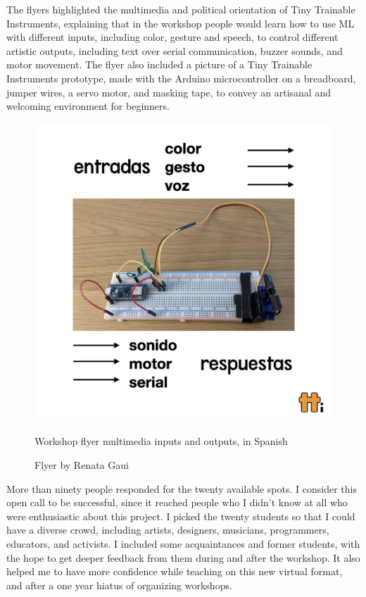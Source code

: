 The flyers highlighted the multimedia and political orientation of Tiny Trainable Instruments, explaining that in the workshop people would learn how to use \acrshort{ML} with different inputs, including color, gesture and speech, to control different artistic outputs, including text over serial communication, buzzer sounds, and motor movement. The flyer also included a picture of a Tiny Trainable Instruments prototype, made with the Arduino microcontroller on a breadboard, jumper wires, a servo motor, and masking tape, to convey an artisanal and welcoming environment for beginners.


\begin{figure}[ht]
  \centering
  \includegraphics[width=0.75\linewidth,height=0.35\textheight,keepaspectratio]{images/workshop-es-2.jpg}
  \caption{Workshop flyer multimedia inputs and outputs, in Spanish}
  \caption*{Flyer by Renata Gaui}
  \label{fig:workshop-spanish-flyer-page-2}
\end{figure}

More than ninety people responded for the twenty available spots. I consider this open call to be successful, since it reached people who I didn't know at all who were enthusiastic about this project. I picked the twenty students so that I could have a diverse crowd, including artists, designers, musicians, programmers, educators, and activists. I included some acquaintances and former students, with the hope to get deeper feedback from them during and after the workshop. It also helped me to have more confidence while teaching on this new virtual format, and after a one year hiatus of organizing workshops.

